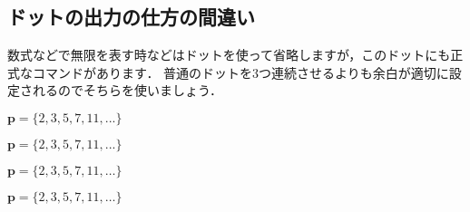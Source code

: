 \documentclass[dvipdfmx,uplatex]{jsarticle}
\begin{document}
{\subsection{ドットの出力の仕方の間違い}
数式などで無限を表す時などはドットを使って省略しますが，このドットにも正式なコマンドがあります．
普通のドットを3つ連続させるよりも余白が適切に設定されるのでそちらを使いましょう．
\begin{tcolorbox}[title=ドットの出力方法]
    \begin{tcolorbox}[title=直接ドットを3つ出力する, colframe=wrongcolor]
      \begin{excode}
        $\bm{p}=\{2,3,5,7,11,...\}$
      \end{excode}
        $\bm{p}=\{2,3,5,7,11,...\}$
    \end{tcolorbox}
    \begin{tcolorbox}[title=\textbackslash ldotsを使用する, colframe=correctcolor]
      \begin{excode}
        $\bm{p}=\{2,3,5,7,11,\ldots\}$
      \end{excode}
        $\bm{p}=\{2,3,5,7,11,\ldots\}$
    \end{tcolorbox}
\end{tcolorbox}

\newcommand{\rsqbracket}{]}
}
\end{document}
